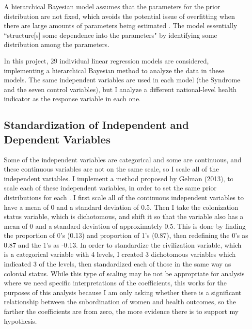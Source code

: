 A hierarchical Bayesian model assumes that the parameters for the prior distribution are not fixed, which avoids the potential issue of overfitting when there are large amounts of parameters being estimated \citep{gelman}. The model essentially ``structure[s] some dependence into the parameters" \citep{gelman} by identifying some distribution among the parameters. 

In this project, 29 individual linear regression models are considered, implementing a hierarchical Bayesian method to analyze the data in these models. The same independent variables are used in each model (the Syndrome and the seven control variables), but I analyze a different national-level health indicator as the response variable in each one.

\subsection{Standardization of Independent and Dependent Variables}

Some of the independent variables are categorical and some are continuous, and these continuous variables are not on the same scale, so I scale all of the independent variables. I implement a method proposed by Gelman (2013), to scale each of these independent variables, in order to set the same prior distributions for each \citep{gelman}. I first scale all of the continuous independent variables to have a mean of 0 and a standard deviation of 0.5. Then I take the colonization status variable, which is dichotomous, and shift it so that the variable also has a mean of 0 and a standard deviation of approximately 0.5. This is done by finding the proportion of 0's (0.13) and proportion of 1's (0.87), then redefining the 0's as 0.87 and the 1's as -0.13. In order to standardize the civilization variable, which is a categorical variable with 4 levels, I created 3 dichotomous variables which indicated 3 of the levels, then standardized each of those in the same way as colonial status. While this type of scaling may be not be appropriate for analysis where we need specific interpretations of the coefficients, this works for the purposes of this analysis because I am only asking whether there is a significant relationship between the subordination of women and health outcomes, so the farther the coefficients are from zero, the more evidence there is to support my hypothesis.

